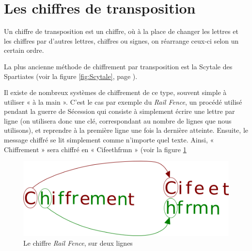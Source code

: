 \section{Les chiffres de transposition\label{sec:Transposition}}
Un chiffre de transposition est un chiffre, où à la place de changer
les lettres et les chiffres par d'autres lettres, chiffres ou signes,
on réarrange ceux-ci selon un certain ordre.

La plus ancienne méthode de chiffrement par transposition est la
Scytale des Spartiates (voir la figure \ref{fig:Scytale}, page
\pageref{fig:Scytale}).

Il existe de nombreux systèmes de chiffrement de ce type, souvent
simple à utiliser « à la main ». C'est le cas par exemple du
\emph{Rail Fence}, un procédé utilisé pendant la guerre de Sécession
qui consiste à simplement écrire une lettre par ligne (on utilisera donc
une clé, correspondant au nombre de lignes que nous utilisons), et
reprendre à la première ligne une fois la dernière atteinte. Ensuite,
le message chiffré se lit simplement comme n'importe quel texte.
Ainsi, « Chiffrement » sera chiffré en « Cifeethfrmn » (voir la figure \ref{fig:Transposition}
\begin{figure}[h]
  \begin{center}
    \includegraphics[scale=0.4]{images/Transposition.png}
  \end{center}
  \caption{Le chiffre \emph{Rail Fence}, sur deux lignes}
  \label{fig:Transposition}
\end{figure}

